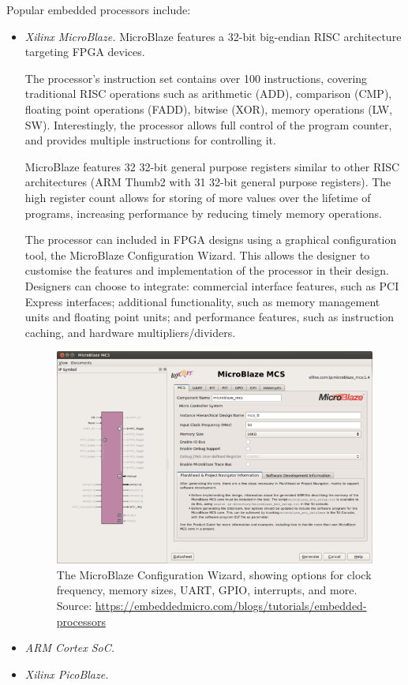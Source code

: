 \documentclass[11pt,a4paper]{report}
\begin{document}
Popular embedded processors include:
\begin{itemize}
\item{\textit{Xilinx MicroBlaze.} MicroBlaze features a 32-bit big-endian RISC architecture targeting FPGA devices. 

The processor's instruction set contains over 100 instructions, covering traditional RISC operations such as arithmetic (ADD), comparison (CMP), floating point operations (FADD), bitwise (XOR), memory operations (LW, SW). Interestingly, the processor allows full control of the program counter, and provides multiple instructions for controlling it.

MicroBlaze features 32 32-bit general purpose registers similar to other RISC architectures (ARM Thumb2 with 31 32-bit general purpose registers). The high register count allows for storing of more values over the lifetime of programs, increasing performance by reducing timely memory operations.

The processor can included in FPGA designs using a graphical configuration tool, the MicroBlaze Configuration Wizard. This allows the designer to customise the features and implementation of the processor in their design. Designers can choose to integrate: commercial interface features, such as PCI Express interfaces; additional functionality, such as memory management units and floating point units; and performance features, such as instruction caching, and hardware multipliers/dividers.

\begin{figure}[H]
\centering
\includegraphics[scale=0.5]{mcw2}
\caption{The MicroBlaze Configuration Wizard, showing options for clock frequency, memory sizes, UART, GPIO, interrupts, and more. Source: \url{https://embeddedmicro.com/blogs/tutorials/embedded-processors}}
\end{figure}
}



\item{\textit{ARM Cortex SoC.}}

\item{\textit{Xilinx PicoBlaze. }}
\end{itemize}
\end{document}
